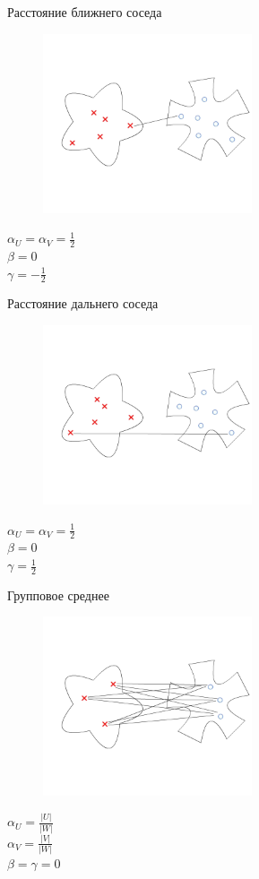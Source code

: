 \documentclass[10pt]{beamer}
\begin{document}
\begin{frame}{Расстояние ближнего соседа}
	\begin{figure}[htbp]
	  \includegraphics[height=150pt, keepaspectratio = true]{images/lans1}  
	\end{figure}
	\pause
	${\alpha_U = \alpha_V = \frac{1}{2}}$ \\${\beta = 0}$ \\${\gamma = -\frac{1}{2}}$
\end{frame}

\begin{frame}{Расстояние дальнего соседа}
	\begin{figure}[htbp]
	  \includegraphics[height=150pt, keepaspectratio = true]{images/lans2}  
	\end{figure}
	\pause
	${\alpha_U = \alpha_V = \frac{1}{2}}$ \\${\beta = 0}$ \\${\gamma = \frac{1}{2}}$
\end{frame}

\begin{frame}{Групповое среднее}
	\begin{figure}[htbp]
	  \includegraphics[height=150pt, keepaspectratio = true]{images/lans3}  
	\end{figure}
	\pause
	${\alpha_U = \frac{\vert U \vert}{\vert W \vert}}$\\${\alpha_V = \frac{\vert V \vert}{\vert W \vert}}$ \\${\beta = \gamma = 0}$
\end{frame}
\end{document}

